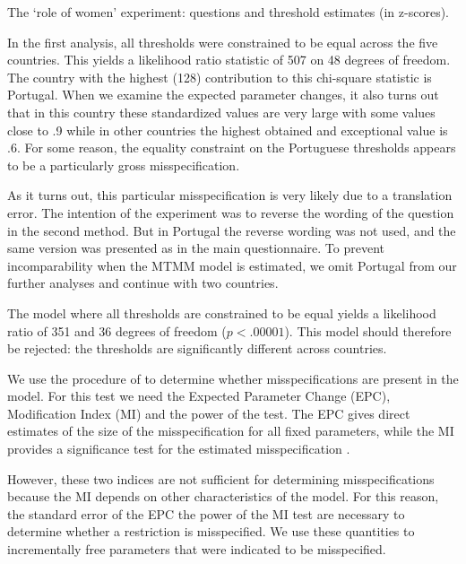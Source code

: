 \documentclass[a4paper,12pt]{article}
\begin{document}
\begin{table}[bht]\caption{\label{card:women}The `role of women' experiment: questions and threshold estimates (in z-scores).}\fbox{\begin{minipage}{\textwidth}\begin{small}
	
\end{small}\end{minipage}}\end{table}

In the first analysis, all thresholds were constrained to be equal across the five countries. This yields a likelihood ratio statistic of 507 on 48 degrees of freedom. The country with the highest (128) contribution to this chi-square statistic is Portugal. When we examine the expected parameter changes, it also turns out that in this country these standardized values are very large with some values close to .9 while in other countries the highest obtained and exceptional value is .6. For some reason, the equality constraint on the Portuguese thresholds appears to be a particularly gross misspecification.

As it turns out, this particular misspecification is very likely due to a translation error. The intention of the experiment was to reverse the wording of the question in the second method. But in Portugal the reverse wording was not used, and the same version was presented as in the main questionnaire.  To prevent incomparability when the MTMM model is estimated, we omit Portugal from our further analyses and continue with two countries. 

The model where all thresholds are constrained to be equal yields a likelihood ratio of 351 and 36 degrees of freedom ($p<.00001$). This model should therefore be rejected: the thresholds are significantly different across countries. 

We use the procedure of \citet{saris_power} to determine whether misspecifications are present in the model. For this test we need the Expected Parameter Change (EPC), Modification Index (MI) and the power of the test. The EPC gives direct estimates of the size of the misspecification for all fixed parameters, while the MI provides a significance test for the estimated misspecification \citep{saris_detection_1987}. 

However, these two indices are not sufficient for determining misspecifications because the MI depends on other characteristics of the model. For this reason, the standard error of the EPC the power of the MI test are necessary to determine whether a restriction is misspecified. We use these quantities to incrementally free parameters that were indicated to be misspecified.
\end{document}
